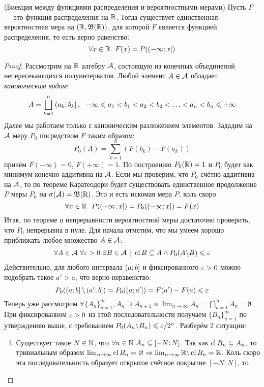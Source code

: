 \begin{theorem} (Биекция между функциями распределения и вероятностными мерами)
	Пусть $F$ --- это функция распределения на $\mathbb{R}$. Тогда существует единственная вероятностная мера на $(\mathbb{R}, \mathfrak{B}(\mathbb{R}))$, для которой $F$ является функцией распределения, то есть верно равенство:
	\[
		\forall x \in \mathbb{R}\ \ F(x) = P(\left(-\infty; x\right])
	\]
\end{theorem}

\begin{proof}
	Рассмотрим на $\mathbb{R}$ алгебру $\mathcal{A}$, состоящую из конечных объединений непересекающихся полуинтервалов. Любой элемент $A \in \mathcal{A}$ обладает \textit{каноническим видом}:
	\[
		A = \bigsqcup_{k = 1}^n \left(a_k; b_k\right],\ \ -\infty \leqslant a_1 < b_1 < a_2 < b_2 < \ldots < a_n < b_n \leqslant +\infty
	\]
	Далее мы работаем только с каноническим разложением элементов. Зададим на $\mathcal{A}$ меру $P_0$ посредством $F$ таким образом:
	\[
		P_0(A) = \sum_{k = 1}^n (F(b_k) - F(a_k))
	\]
	причём $F(-\infty) = 0$, $F(+\infty) = 1$. По построению $P_0(\mathbb{R}) = 1$ и $P_0$ будет как минимум конечно аддитивна на $\mathcal{A}$. Если мы проверим, что $P_0$ счётно аддитивна на $\mathcal{A}$, то по теореме Каратеодори будет существовать единственное продолжение $P$ меры $P_0$ на $\sigma(\mathcal{A}) = \mathfrak{B}(\mathbb{R})$. Это и есть искомая мера $P$, коль скоро
	\[
		\forall x \in \R\ \ P(\rsi{-\infty; x}) = P_0(\rsi{-\infty; x}) = F(x)
	\]
	Итак, по теореме о непрерывности вероятностной меры достаточно проверить, что $P_0$ непрерывна в нуле. Для начала отметим, что мы умеем хорошо приближать любое множество $A \in \mathcal{A}$:
	\[
		\forall A \in \mathcal{A}\ \forall \varepsilon > 0\ \exists B \in \mathcal{A} \ \big|\  \operatorname{cl} B \subseteq A \wedge P_0(A \backslash B) \leqslant \varepsilon
	\]
	Действительно, для любого интервала $\left(a; b\right]$ и фиксированного $\varepsilon > 0$ можно подобрать такое $a' > a$, что верно неравенство:
	\[
		P_0(\left(a; b\right] \backslash \left(a'; b\right]) = P_0(\left(a; a'\right]) = F(a') - F(a) \leqslant \varepsilon
	\]
	Теперь уже рассмотрим $\forall \{A_n\}_{n = 1}^\infty, A_n \supseteq A_{n + 1}$ и $\lim_{n \to \infty} A_n = \bigcap_{n = 1}^\infty A_n = \emptyset$. При фиксированном $\varepsilon > 0$ из этой последовательности получаем $\{B_n\}_{n = 1}^\infty$ по утверждению выше, с требованием $P_0(A_n \backslash B_n) \leqslant \varepsilon / 2^n$. Разберём 2 ситуации:
	\begin{enumerate}
		\item Существует такое $N \in \mathbb{N}$, что $\forall n \in \mathbb{N}\ A_n \subseteq [-N; N]$. Так как $\operatorname{cl} B_n \subseteq A_n$, то тривиальным образом $\lim_{n \to \infty} \operatorname{cl} B_n = \varnothing \Rightarrow \lim_{n \to \infty} \mathbb{R} \backslash \operatorname{cl} B_n = \mathbb{R}$. Коль скоро эта последовательность образует открытое счётное покрытие $[-N; N]$, то

\end{enumerate}
\end{proof}
